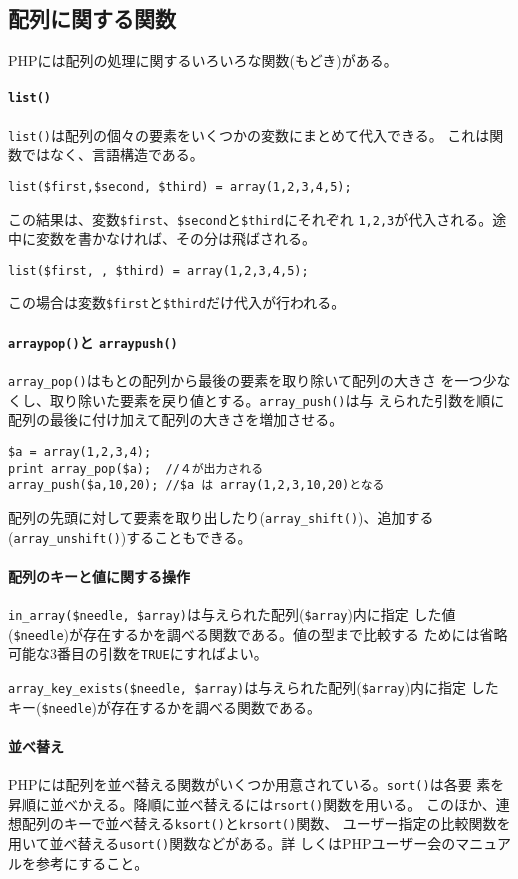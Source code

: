\subsection{配列に関する関数}
PHPには配列の処理に関するいろいろな関数(もどき)がある。
\paragraph{\protect\texttt{list()}}
\texttt{list()}は配列の個々の要素をいくつかの変数にまとめて代入できる。
これは関数ではなく、言語構造である。
\begin{Verbatim}
list($first,$second, $third) = array(1,2,3,4,5);
\end{Verbatim}
この結果は、変数\Verb+$first+、\Verb+$second+と\Verb+$third+にそれぞれ
\texttt{1,2,3}が代入される。途中に変数を書かなければ、その分は飛ばされる。
\begin{Verbatim}
list($first, , $third) = array(1,2,3,4,5);
\end{Verbatim}
この場合は変数\Verb+$first+と\Verb+$third+だけ代入が行われる。
\paragraph{\protect\texttt{array\textunderscore pop()}と
\protect\texttt{array\textunderscore push()}}
\Verb+array_pop()+はもとの配列から最後の要素を取り除いて配列の大きさ
を一つ少なくし、取り除いた要素を戻り値とする。\Verb+array_push()+は与
えられた引数を順に配列の最後に付け加えて配列の大きさを増加させる。
\begin{Verbatim}
$a = array(1,2,3,4);
print array_pop($a);  //４が出力される
array_push($a,10,20); //$a は array(1,2,3,10,20)となる
\end{Verbatim}
配列の先頭に対して要素を取り出したり(\Verb+array_shift()+)、追加する
(\Verb+array_unshift()+)することもできる。
\paragraph{配列のキーと値に関する操作}
\Verb+in_array($needle, $array)+は与えられた配列(\Verb+$array+)内に指定
した値(\Verb+$needle+)が存在するかを調べる関数である。値の型まで比較する
ためには省略可能な3番目の引数を\Verb+TRUE+にすればよい。

\Verb+array_key_exists($needle, $array)+は与えられた配列(\Verb+$array+)内に指定
したキー(\Verb+$needle+)が存在するかを調べる関数である。
\paragraph{並べ替え}
PHPには配列を並べ替える関数がいくつか用意されている。\Verb+sort()+は各要
素を昇順に並べかえる。降順に並べ替えるには\Verb+rsort()+関数を用いる。
このほか、連想配列のキーで並べ替える\Verb+ksort()+と\Verb+krsort()+関数、
ユーザー指定の比較関数を用いて並べ替える\Verb+usort()+関数などがある。詳
しくはPHPユーザー会のマニュアルを参考にすること。
